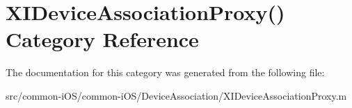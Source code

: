 \hypertarget{category_x_i_device_association_proxy_07_08}{}\section{X\+I\+Device\+Association\+Proxy() Category Reference}
\label{category_x_i_device_association_proxy_07_08}


The documentation for this category was generated from the following file\+:\begin{DoxyCompactItemize}
\item 
src/common-\/i\+O\+S/common-\/i\+O\+S/\+Device\+Association/X\+I\+Device\+Association\+Proxy.\+m\end{DoxyCompactItemize}

